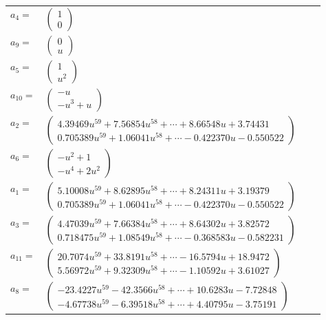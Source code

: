 \documentclass[1p]{elsarticle_modified}
\theoremstyle{definition}
\begin{document}
\begin{tabular}{m{7pt} m{180pt} m{7pt} m{180pt} }
\flushright $a_{4}=$&$\begin{pmatrix}1\\0\end{pmatrix}$ \\
\flushright $a_{9}=$&$\begin{pmatrix}0\\u\end{pmatrix}$ \\
\flushright $a_{5}=$&$\begin{pmatrix}1\\u^2\end{pmatrix}$ \\
\flushright $a_{10}=$&$\begin{pmatrix}- u\\- u^3+u\end{pmatrix}$ \\
\flushright $a_{2}=$&$\begin{pmatrix}4.39469 u^{59}+7.56854 u^{58}+\cdots+8.66548 u+3.74431\\0.705389 u^{59}+1.06041 u^{58}+\cdots-0.422370 u-0.550522\end{pmatrix}$ \\
\flushright $a_{6}=$&$\begin{pmatrix}- u^2+1\\- u^4+2 u^2\end{pmatrix}$ \\
\flushright $a_{1}=$&$\begin{pmatrix}5.10008 u^{59}+8.62895 u^{58}+\cdots+8.24311 u+3.19379\\0.705389 u^{59}+1.06041 u^{58}+\cdots-0.422370 u-0.550522\end{pmatrix}$ \\
\flushright $a_{3}=$&$\begin{pmatrix}4.47039 u^{59}+7.66384 u^{58}+\cdots+8.64302 u+3.82572\\0.718475 u^{59}+1.08549 u^{58}+\cdots-0.368583 u-0.582231\end{pmatrix}$ \\
\flushright $a_{11}=$&$\begin{pmatrix}20.7074 u^{59}+33.8191 u^{58}+\cdots-16.5794 u+18.9472\\5.56972 u^{59}+9.32309 u^{58}+\cdots-1.10592 u+3.61027\end{pmatrix}$ \\
\flushright $a_{8}=$&$\begin{pmatrix}-23.4227 u^{59}-42.3566 u^{58}+\cdots+10.6283 u-7.72848\\-4.67738 u^{59}-6.39518 u^{58}+\cdots+4.40795 u-3.75191\end{pmatrix}$ \\

\end{tabular}
\end{document}
